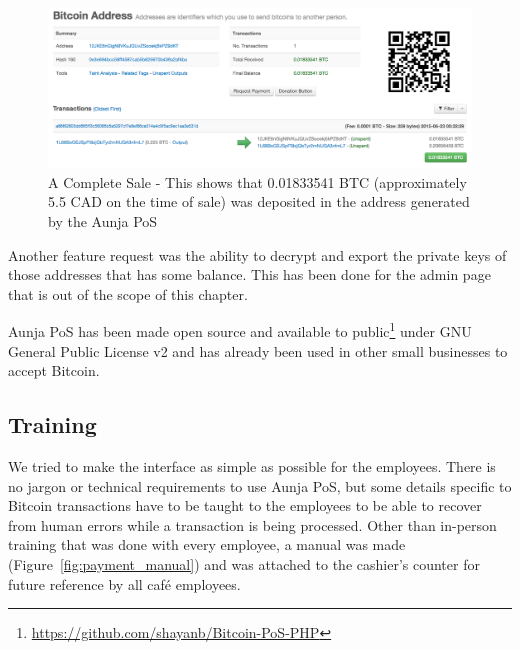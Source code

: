 \begin{figure}
\centering
\includegraphics[width=\linewidth]{fig/complete_sale.png}
  \caption{A Complete Sale - This shows that 0.01833541 BTC (approximately 5.5 CAD on the time of sale) was deposited in the address generated by the Aunja PoS} 
\label{fig:report_page}
\end{figure}


Another feature request was the ability to decrypt and export the private keys of those addresses that has some balance. This has been done for the admin page that is out of the scope of this chapter. 

Aunja PoS has been made open source and available to public\footnote{\url{https://github.com/shayanb/Bitcoin-PoS-PHP}} under GNU General Public License v2 and has already been used in other small businesses to accept Bitcoin.

\subsection{Training}

We tried to make the interface as simple as possible for the employees. There is no jargon or technical requirements to use Aunja PoS, but some details specific to Bitcoin transactions have to be taught to the employees to be able to recover from human errors while a transaction is being processed.
Other than in-person training that was done with every employee, a manual was made (Figure~\ref{fig:payment_manual}) and was attached to the cashier's counter for future reference by all caf\'{e} employees.

